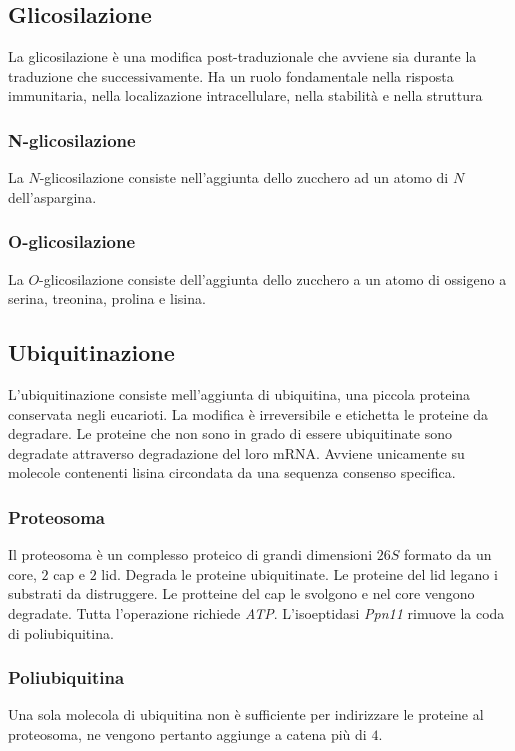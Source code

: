 	\subsection{Glicosilazione}
	La glicosilazione \`e una modifica post-traduzionale che avviene sia durante la traduzione che successivamente.
	Ha un ruolo fondamentale nella risposta immunitaria, nella localizazione intracellulare, nella stabilit\`a e nella struttura

		\subsubsection{N-glicosilazione}
		La $N$-glicosilazione consiste nell'aggiunta dello zucchero ad un atomo di $N$ dell'aspargina.

		\subsubsection{O-glicosilazione}
		La $O$-glicosilazione consiste dell'aggiunta dello zucchero a un atomo di ossigeno a serina, treonina, prolina e lisina.

	\subsection{Ubiquitinazione}
	L'ubiquitinazione consiste mell'aggiunta di ubiquitina, una piccola proteina conservata negli eucarioti.
	La modifica \`e irreversibile e etichetta le proteine da degradare.
	Le proteine che non sono in grado di essere ubiquitinate sono degradate attraverso degradazione del loro mRNA.
	Avviene unicamente su molecole contenenti lisina circondata da una sequenza consenso specifica.

		\subsubsection{Proteosoma}
		Il proteosoma \`e un complesso proteico di grandi dimensioni $26S$ formato da un core, $2$ cap e $2$ lid.
		Degrada le proteine ubiquitinate.
		Le proteine del lid legano i substrati da distruggere.
		Le protteine del cap le svolgono e nel core vengono degradate.
		Tutta l'operazione richiede \emph{ATP}.
		L'isoeptidasi \emph{Ppn11} rimuove la coda di poliubiquitina.

		\subsubsection{Poliubiquitina}
		Una sola molecola di ubiquitina non \`e sufficiente per indirizzare le proteine al proteosoma, ne vengono pertanto aggiunge a catena pi\`u di $4$.


